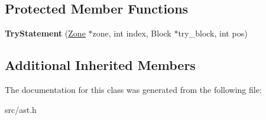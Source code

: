 \subsection*{Protected Member Functions}
\begin{DoxyCompactItemize}
\item 
\hypertarget{classv8_1_1internal_1_1_try_statement_af77d3202822031caf5233d9ad29112e0}{}{\bfseries Try\+Statement} (\hyperlink{classv8_1_1internal_1_1_zone}{Zone} $\ast$zone, int index, Block $\ast$try\+\_\+block, int pos)\label{classv8_1_1internal_1_1_try_statement_af77d3202822031caf5233d9ad29112e0}

\end{DoxyCompactItemize}
\subsection*{Additional Inherited Members}


The documentation for this class was generated from the following file\+:\begin{DoxyCompactItemize}
\item 
src/ast.\+h\end{DoxyCompactItemize}
